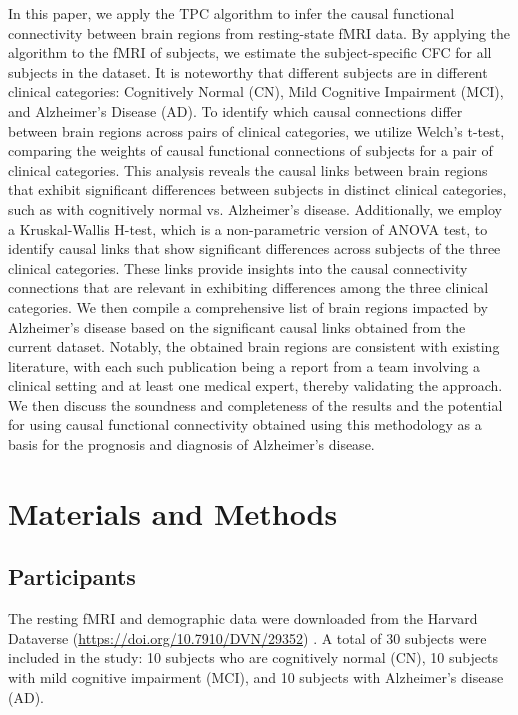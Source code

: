 \documentclass[12pt,reqno]{amsart}
\theoremstyle{definition}
\begin{document}
In this paper, we apply the TPC algorithm to infer the causal functional connectivity between brain regions from resting-state fMRI data. By applying the algorithm to the fMRI of subjects, we estimate the subject-specific CFC for all subjects in the dataset. It is noteworthy that different subjects are in different clinical categories: Cognitively Normal (CN), Mild Cognitive Impairment (MCI), and Alzheimer's Disease (AD). To identify which causal connections differ between brain regions across pairs of clinical categories, we utilize Welch's t-test, comparing the weights of causal functional connections of subjects for a pair of clinical categories. This analysis reveals the causal links between brain regions that exhibit significant differences between subjects in distinct clinical categories, such as with cognitively normal vs. Alzheimer's disease. Additionally, we employ a Kruskal-Wallis H-test, which is a non-parametric version of ANOVA test, to identify causal links that show significant differences across subjects of the three clinical categories. These links provide insights into the causal connectivity connections that are relevant in exhibiting differences among the three clinical categories. We then compile a comprehensive list of brain regions impacted by Alzheimer's disease based on the significant causal links obtained from the current dataset. Notably, the obtained brain regions are consistent with existing literature, with each such publication being a report from a team involving a clinical setting and at least one medical expert, thereby validating the approach. We then discuss the soundness and completeness of the results and the potential for using  causal functional connectivity obtained using this methodology as a basis for the prognosis and diagnosis of Alzheimer's disease.

\section{Materials and Methods}
\subsection{Participants}
The resting fMRI and demographic data were downloaded from the Harvard Dataverse (\href{https://doi.org/10.7910/DVN/29352}{https://doi.org/10.7910/DVN/29352}) \citep{harvarddata}. A total of 30 subjects were included in the study: 10 subjects who are cognitively normal (CN), 10 subjects with mild cognitive impairment (MCI), and 10 subjects with Alzheimer's disease (AD).
\end{document}
